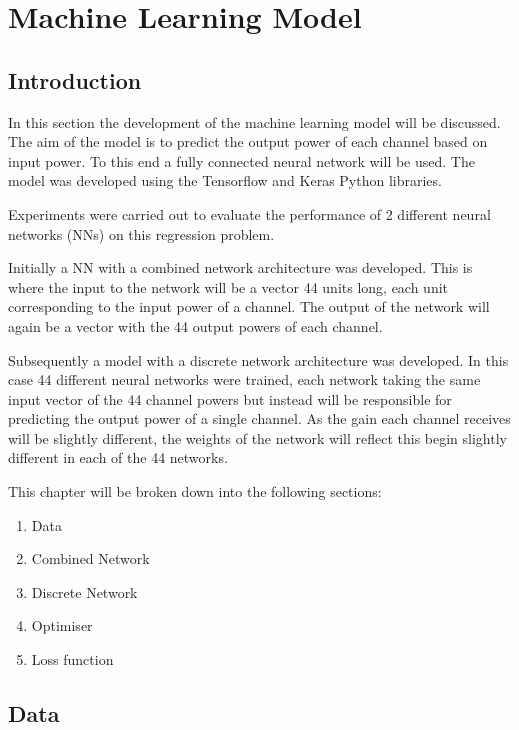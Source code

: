 


\newpage
\section{Machine Learning Model}\label{tw:ml_model}


\subsection{Introduction}
In this section the development of the machine learning model will be discussed. The aim of the model is to predict the output power of each channel based on input power. To this end a fully connected neural network will be used. The model was developed using the Tensorflow and Keras Python libraries.

Experiments were carried out to evaluate the performance of 2 different neural networks (NNs) on this regression problem.

Initially a NN with a combined network architecture was developed. This is where the input to the network will be a vector 44 units long, each unit corresponding to the input power of a channel. The output of the network will again be a vector with the 44 output powers of each channel.

Subsequently a model with a discrete network architecture was developed. In this case 44 different neural networks were trained, each network taking the same input vector of the 44 channel powers but instead will be responsible for predicting the output power of a single channel. As the gain each channel receives will be slightly different, the weights of the network will reflect this begin slightly different in each of the 44 networks.


This chapter will be broken down into the following sections:
\begin{enumerate}
    \item Data
    \item Combined Network
    \item Discrete Network
    \item Optimiser
    \item Loss function
\end{enumerate}

\subsection{Data}
\FloatBarrier

